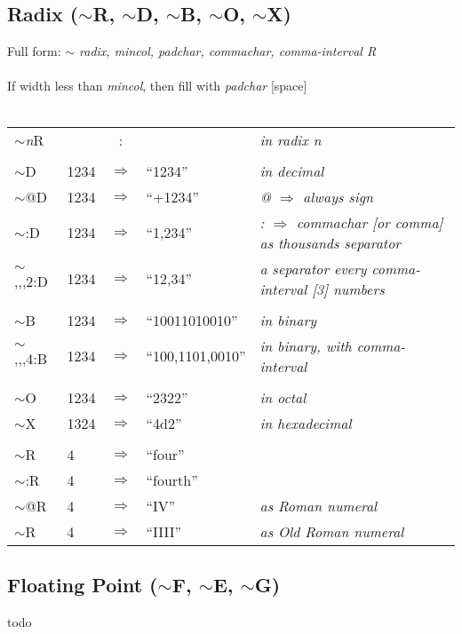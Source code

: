 \documentclass{article}
\begin{document}
\subsection{Radix ($\sim$R, $\sim$D, $\sim$B, $\sim$O, $\sim$X)}
Full form: {\em $\sim$ radix, mincol, padchar, commachar, comma-interval R} \\
\\
If width less than {\em mincol}, then fill with {\em padchar} [space] \\
\\
\begin{tabular}{llcll}
  $\sim${\em n}R & & : &          & {\em in radix n} \\
\\
  $\sim$D  & 1234 & $\Rightarrow$ & ``1234''  & {\em in decimal} \\
  $\sim$@D & 1234 & $\Rightarrow$ & ``+1234'' & {\em @ $\Rightarrow$ always sign} \\
  $\sim$:D & 1234 & $\Rightarrow$ & ``1,234'' & {\em : $\Rightarrow$ {\em commachar} [or comma] as
    thousands separator} \\
  $\sim$,,,2:D & 1234 & $\Rightarrow$ & ``12,34'' & {\em a separator every
    {\em comma-interval} [3] numbers} \\
\\
  $\sim$B      & 1234 & $\Rightarrow$ & ``10011010010''   & {\em in binary} \\
  $\sim$,,,4:B & 1234 & $\Rightarrow$ & ``100,1101,0010'' & {\em in binary, with comma-interval} \\
\\
  $\sim$O & 1234 & $\Rightarrow$ & ``2322'' & {\em in octal} \\
  $\sim$X & 1324 & $\Rightarrow$ & ``4d2''  & {\em in hexadecimal} \\
\\
  $\sim$R  & 4 & $\Rightarrow$ & ``four'' \\
  $\sim$:R & 4 & $\Rightarrow$ & ``fourth'' \\
  $\sim$@R & 4 & $\Rightarrow$ & ``IV'' & {\em as Roman numeral} \\
  $\sim$R  & 4 & $\Rightarrow$ & ``IIII'' & {\em as Old Roman numeral} \\
\end{tabular}

\subsection{Floating Point ($\sim$F, $\sim$E, $\sim$G)}
todo
\end{document}
